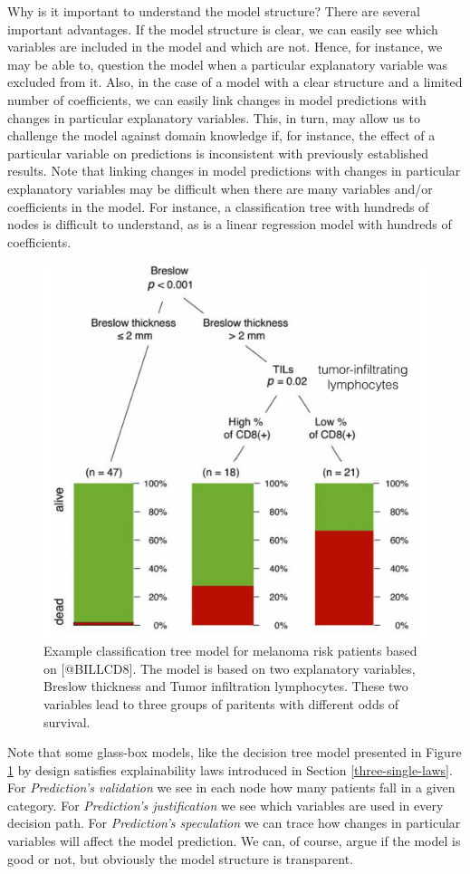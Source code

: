 \documentclass[]{krantz}
\begin{document}
Why is it important to understand the model structure? There are several important advantages. If the model structure is clear, we can easily see which variables are included in the model and which are not. Hence, for instance, we may be able to, question the model when a particular explanatory variable was excluded from it. Also, in the case of a model with a clear structure and a limited number of coefficients, we can easily link changes in model predictions with changes in particular explanatory variables. This, in turn, may allow us to challenge the model against domain knowledge if, for instance, the effect of a particular variable on predictions is inconsistent with previously established results. Note that linking changes in model predictions with changes in particular explanatory variables may be difficult when there are many variables and/or coefficients in the model. For instance, a classification tree with hundreds of nodes is difficult to understand, as is a linear regression model with hundreds of coefficients.

\begin{figure}

{\centering \includegraphics[width=0.5\linewidth]{figure/wbBILL8model} 

}

\caption{Example classification tree model for melanoma risk patients based on [@BILLCD8]. The model is based on two explanatory variables, Breslow thickness and Tumor infiltration lymphocytes. These two variables lead to three groups of paritents with different odds of survival.}\label{fig:BILLCD8}
\end{figure}

Note that some glass-box models, like the decision tree model presented in Figure \ref{fig:BILLCD8} by design satisfies explainability laws introduced in Section \ref{three-single-laws}.
For \emph{Prediction's validation} we see in each node how many patients fall in a given category. For \emph{Prediction's justification} we see which variables are used in every decision path. For \emph{Prediction's speculation} we can trace how changes in particular variables will affect the model prediction. We can, of course, argue if the model is good or not, but obviously the model structure is transparent.
\end{document}
